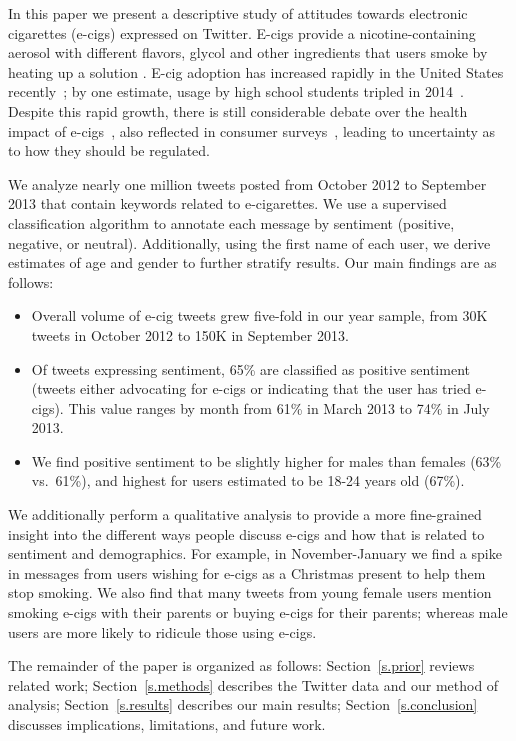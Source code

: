 \documentclass{sig-alternate}
\begin{document}
In this paper we present a descriptive study of attitudes towards electronic
cigarettes (e-cigs) expressed on Twitter. E-cigs provide a
nicotine-containing aerosol with different flavors, glycol and other
ingredients that users smoke by heating up a solution
\cite{grana2014cigarettes}. E-cig adoption has increased rapidly in the United
States recently~\cite{king2013awareness,centers2013notes}; by one estimate,
usage by high school students tripled in 2014~\cite{ecig2015triples}. Despite
this rapid growth, there is still considerable debate over the health impact
of e-cigs~\cite{sussan2015exposure,pauly2007tobacco,bhatnagar2014electronic},
also reflected in consumer surveys~\cite{pepper2015risky}, leading to
uncertainty as to how they should be regulated.

We analyze nearly one million tweets posted from October 2012 to September
2013 that contain keywords related to e-cigarettes. We use a supervised
classification algorithm to annotate each message by sentiment (positive,
negative, or neutral). Additionally, using the first name of each user, we
derive estimates of age and gender to further stratify results. Our main
findings are as follows:
\begin{itemize}
\item Overall volume of e-cig tweets grew five-fold in our year sample, from
  30K tweets in October 2012 to 150K in September 2013.
\item Of tweets expressing sentiment, 65\% are classified as positive
  sentiment (tweets either advocating for e-cigs or indicating that the user
  has tried e-cigs). This value ranges by month from 61\% in March 2013 to
  74\% in July 2013. 
\item We find positive sentiment to be slightly higher for males than females
  (63\% vs.~61\%), and highest for users estimated to be 18-24 years old (67\%).
\end{itemize}

We additionally perform a qualitative analysis to provide a more fine-grained
insight into the different ways people discuss e-cigs and how that is related
to sentiment and demographics. For example, in November-January we find a
spike in messages from users wishing for e-cigs as a Christmas present to help
them stop smoking. We also find that many tweets from young female users
mention smoking e-cigs with their parents or buying e-cigs for their parents;
whereas male users are more likely to ridicule those using e-cigs.

The remainder of the paper is organized as follows: Section~\ref{s.prior}
reviews related work; Section~\ref{s.methods} describes the Twitter data and
our method of analysis; Section~\ref{s.results} describes our main results;
Section~\ref{s.conclusion} discusses implications, limitations, and future
work.
\end{document}
